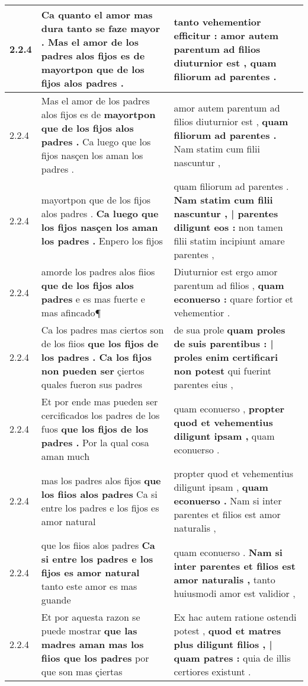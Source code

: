 \begin{tabular}{|p{1cm}|p{6.5cm}|p{6.5cm}|}
2.2.4 & Ca quanto el amor mas dura tanto se faze mayor . \textbf{ Mas el amor de los padres alos fijos es de } mayortpon que de los fijos alos padres . & tanto vehementior efficitur : \textbf{ amor autem parentum ad filios diuturnior est , } quam filiorum ad parentes . \\\hline
2.2.4 & Mas el amor de los padres alos fijos es de \textbf{ mayortpon que de los fijos alos padres . } Ca luego que los fijos nasçen los aman los padres . & amor autem parentum ad filios diuturnior est , \textbf{ quam filiorum ad parentes . } Nam statim cum filii nascuntur , \\\hline
2.2.4 & mayortpon que de los fijos alos padres . \textbf{ Ca luego que los fijos nasçen los aman los padres . } Enpero los fijos & quam filiorum ad parentes . \textbf{ Nam statim cum filii nascuntur , | parentes diligunt eos : } non tamen filii statim incipiunt amare parentes , \\\hline
2.2.4 & amorde los padres alos fiios \textbf{ que de los fijos alos padres } e es mas fuerte e mas afincado¶ & Diuturnior est ergo amor parentum ad filios , \textbf{ quam econuerso : } quare fortior et vehementior . \\\hline
2.2.4 & Ca los padres mas ciertos son de los fiios \textbf{ que los fijos de los padres . Ca los fijos non pueden ser } çiertos quales fueron sus padres & de sua prole \textbf{ quam proles de suis parentibus : | proles enim certificari non potest } qui fuerint parentes eius , \\\hline
2.2.4 & Et por ende mas pueden ser cercificados los padres de los fuos \textbf{ que los fijos de los padres . } Por la qual cosa aman mucħ & quam econuerso , \textbf{ propter quod et vehementius diligunt ipsam , } quam econuerso . \\\hline
2.2.4 & mas los padres alos fijos \textbf{ que los fiios alos padres } Ca si entre los padres e los fijos es amor natural & propter quod et vehementius diligunt ipsam , \textbf{ quam econuerso . } Nam si inter parentes et filios est amor naturalis , \\\hline
2.2.4 & que los fiios alos padres \textbf{ Ca si entre los padres e los fijos es amor natural } tanto este amor es mas guande & quam econuerso . \textbf{ Nam si inter parentes et filios est amor naturalis , } tanto huiusmodi amor est validior , \\\hline
2.2.4 & Et por aquesta razon se puede mostrar \textbf{ que las madres aman mas los fiios que los padres } por que son mas çiertas & Ex hac autem ratione ostendi potest , \textbf{ quod et matres plus diligunt filios , | quam patres : } quia de illis certiores existunt . \\\hline

\end{tabular}
